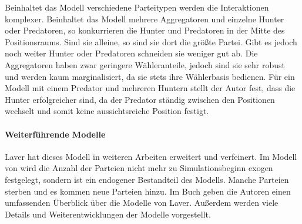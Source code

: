 Beinhaltet das Modell verschiedene Parteitypen werden die Interaktionen komplexer. Beinhaltet das Modell mehrere Aggregatoren und einzelne Hunter oder Predatoren, so konkurrieren die Hunter und Predatoren in der Mitte des Positionsraums. Sind sie alleine, so sind sie dort die größte Partei. Gibt es jedoch noch weiter Hunter oder Predatoren schneiden sie weniger gut ab. Die Aggregatoren haben zwar geringere Wähleranteile, jedoch sind sie sehr robust und werden kaum marginalisiert, da sie stets ihre Wählerbasis bedienen.
Für ein Modell mit einem Predator und mehreren Huntern stellt der Autor fest, dass die Hunter erfolgreicher sind, da der Predator ständig zwischen den Positionen wechselt und somit keine aussichtsreiche Position festigt. \citep[S.\,271-4]{laver2005policy}

\paragraph{Weiterführende Modelle}
Laver hat dieses Modell in weiteren Arbeiten erweitert und verfeinert.
Im Modell von \citet{laver2007endogenousParties} wird die Anzahl der Parteien nicht mehr zu Simulationsbeginn exogen festgelegt, sondern ist ein endogener Bestandteil des Modells.
Manche Parteien sterben und es kommen neue Parteien hinzu.
Im Buch \citet{laver2011party} geben die Autoren einen umfassenden Überblick über die Modelle von Laver. Außerdem werden viele Details und Weiterentwicklungen der Modelle vorgestellt.